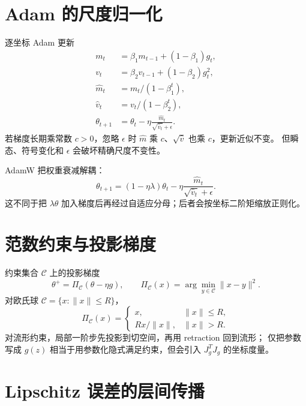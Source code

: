 \documentclass[11pt]{article}
\numberwithin{equation}{section}
\newcommand{\1}{\mathbf{1}}
\begin{document}
\section{Adam 的尺度归一化}

逐坐标 Adam 更新
\begin{align}
 m_t&=\beta_1m_{t-1}+(1-\beta_1)g_t,\\
 v_t&=\beta_2v_{t-1}+(1-\beta_2)g_t^2,\\
 \widehat m_t&=m_t/(1-\beta_1^t),\\
 \widehat v_t&=v_t/(1-\beta_2^t),\\
 \theta_{t+1}&=\theta_t-\eta
 \frac{\widehat m_t}{\sqrt{\widehat v_t}+\epsilon}.
\end{align}
若梯度长期乘常数 $c>0$，忽略 $\epsilon$ 时
$\widehat m$ 乘 $c$、$\sqrt{\widehat v}$ 也乘 $c$，更新近似不变。
但瞬态、符号变化和 $\epsilon$ 会破坏精确尺度不变性。

AdamW 把权重衰减解耦：
\begin{equation}
 \theta_{t+1}=(1-\eta\lambda)\theta_t
 -\eta\frac{\widehat m_t}{\sqrt{\widehat v_t}+\epsilon}.
\end{equation}
这不同于把 $\lambda\theta$ 加入梯度后再经过自适应分母；后者会按坐标二阶矩缩放正则化。

\section{范数约束与投影梯度}

约束集合 $\mathcal C$ 上的投影梯度
\begin{equation}
 \theta^+=\Pi_{\mathcal C}(\theta-\eta g),
 \qquad
 \Pi_{\mathcal C}(x)=\arg\min_{y\in\mathcal C}\|x-y\|^2.
\end{equation}
对欧氏球 $\mathcal C=\{x:\|x\|\le R\}$，
\begin{equation}
 \Pi_{\mathcal C}(x)=
 \begin{cases}
 x,&\|x\|\le R,\\
 Rx/\|x\|,&\|x\|>R.
 \end{cases}
\end{equation}
对流形约束，局部一阶步先投影到切空间，再用 retraction 回到流形；
仅把参数写成 $g(z)$ 相当于用参数化隐式满足约束，但会引入 $J_g^TJ_g$ 的坐标度量。

\section{Lipschitz 误差的层间传播}
\end{document}

